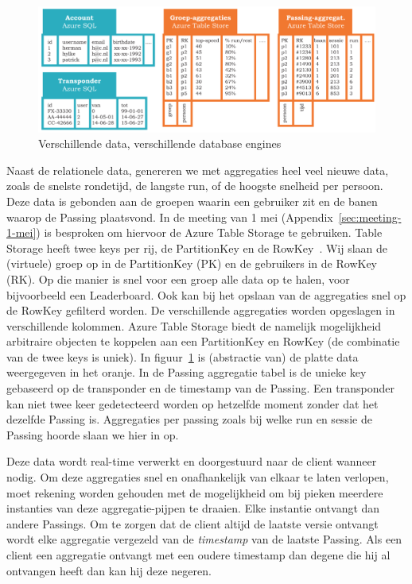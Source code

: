 \begin{figure}
\centering
\includegraphics[width=\textwidth]{style/images/DBEngines}
\caption{Verschillende data, verschillende database engines}
\label{fig:dbengines}
\end{figure}

Naast de relationele data, genereren we met aggregaties heel veel nieuwe data, zoals de snelste rondetijd, de langste run, of de hoogste snelheid per persoon. Deze data is gebonden aan de groepen waarin een gebruiker zit en de banen waarop de Passing plaatsvond. In de meeting van 1 mei (Appendix~\ref{sec:meeting-1-mei}) is besproken om hiervoor de Azure Table Storage te gebruiken. Table Storage heeft twee keys per rij, de PartitionKey en de RowKey~\cite{azuretablestorage}. Wij slaan de (virtuele) groep op in de PartitionKey (PK) en de gebruikers in de RowKey (RK). Op die manier is snel voor een groep alle data op te halen, voor bijvoorbeeld een Leaderboard. Ook kan bij het opslaan van de aggregaties snel op de RowKey gefilterd worden. De verschillende aggregaties worden opgeslagen in verschillende kolommen. Azure Table Storage biedt de namelijk mogelijkheid arbitraire objecten te koppelen aan een PartitionKey en RowKey (de combinatie van de twee keys is uniek). In figuur~\ref{fig:dbengines} is (abstractie van) de platte data weergegeven in het oranje. In de Passing aggregatie tabel is de unieke key gebaseerd op de transponder en de timestamp van de Passing. Een transponder kan niet twee keer gedetecteerd worden op hetzelfde moment zonder dat het dezelfde Passing is. Aggregaties per passing zoals bij welke run en sessie de Passing hoorde slaan we hier in op.

Deze data wordt real-time verwerkt en doorgestuurd naar de client wanneer nodig. Om deze aggregaties snel en onafhankelijk van elkaar te laten verlopen, moet rekening worden gehouden met de mogelijkheid om bij pieken meerdere instanties van deze aggregatie-pijpen te draaien. Elke instantie ontvangt dan andere Passings. Om te zorgen dat de client altijd de laatste versie ontvangt wordt elke aggregatie vergezeld van de \textit{timestamp} van de laatste Passing. Als een client een aggregatie ontvangt met een oudere timestamp dan degene die hij al ontvangen heeft dan kan hij deze negeren.

